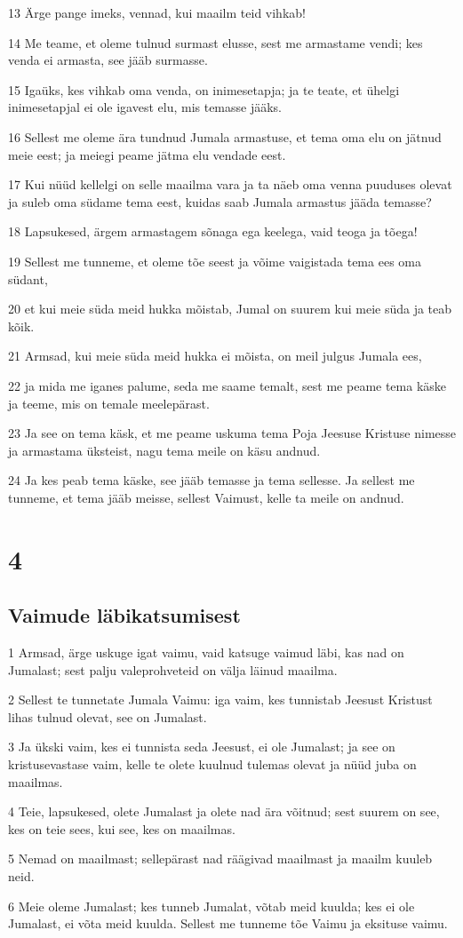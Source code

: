 \par 13 Ärge pange imeks, vennad, kui maailm teid vihkab!
\par 14 Me teame, et oleme tulnud surmast elusse, sest me armastame vendi; kes venda ei armasta, see jääb surmasse.
\par 15 Igaüks, kes vihkab oma venda, on inimesetapja; ja te teate, et ühelgi inimesetapjal ei ole igavest elu, mis temasse jääks.
\par 16 Sellest me oleme ära tundnud Jumala armastuse, et tema oma elu on jätnud meie eest; ja meiegi peame jätma elu vendade eest.
\par 17 Kui nüüd kellelgi on selle maailma vara ja ta näeb oma venna puuduses olevat ja suleb oma südame tema eest, kuidas saab Jumala armastus jääda temasse?
\par 18 Lapsukesed, ärgem armastagem sõnaga ega keelega, vaid teoga ja tõega!
\par 19 Sellest me tunneme, et oleme tõe seest ja võime vaigistada tema ees oma südant,
\par 20 et kui meie süda meid hukka mõistab, Jumal on suurem kui meie süda ja teab kõik.
\par 21 Armsad, kui meie süda meid hukka ei mõista, on meil julgus Jumala ees,
\par 22 ja mida me iganes palume, seda me saame temalt, sest me peame tema käske ja teeme, mis on temale meelepärast.
\par 23 Ja see on tema käsk, et me peame uskuma tema Poja Jeesuse Kristuse nimesse ja armastama üksteist, nagu tema meile on käsu andnud.
\par 24 Ja kes peab tema käske, see jääb temasse ja tema sellesse. Ja sellest me tunneme, et tema jääb meisse, sellest Vaimust, kelle ta meile on andnud.


\chapter{4}

\section*{Vaimude läbikatsumisest}

\par 1 Armsad, ärge uskuge igat vaimu, vaid katsuge vaimud läbi, kas nad on Jumalast; sest palju valeprohveteid on välja läinud maailma.
\par 2 Sellest te tunnetate Jumala Vaimu: iga vaim, kes tunnistab Jeesust Kristust lihas tulnud olevat, see on Jumalast.
\par 3 Ja ükski vaim, kes ei tunnista seda Jeesust, ei ole Jumalast; ja see on kristusevastase vaim, kelle te olete kuulnud tulemas olevat ja nüüd juba on maailmas.
\par 4 Teie, lapsukesed, olete Jumalast ja olete nad ära võitnud; sest suurem on see, kes on teie sees, kui see, kes on maailmas.
\par 5 Nemad on maailmast; sellepärast nad räägivad maailmast ja maailm kuuleb neid.
\par 6 Meie oleme Jumalast; kes tunneb Jumalat, võtab meid kuulda; kes ei ole Jumalast, ei võta meid kuulda. Sellest me tunneme tõe Vaimu ja eksituse vaimu.


